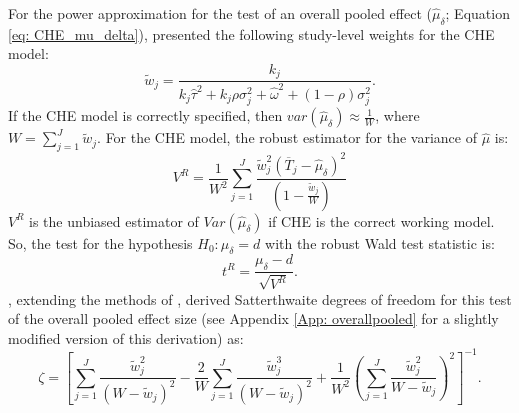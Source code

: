 For the power approximation for the test of an overall pooled effect ($\hat{\mu}_{\delta}$; Equation \ref{eq: CHE_mu_delta}), \textcite{vembye2023} presented the following study-level weights for the CHE model:
\begin{equation} \label{eq: CHEweights-study}
    \tilde{w}_j = \frac{k_j}{k_j\hat{\tau}^2 + k_j\rho\sigma_j^2 +\hat{\omega}^2 + (1- \rho)\sigma_j^2}.
\end{equation}
If the CHE model is correctly specified, then $var(\hat{\mu}_{\delta}) \approx \frac{1}{W}$, where $W = \sum_{j=1}^J \tilde{w}_j$. For the CHE model, the robust estimator for the variance of $\hat{\mu}$ is:
\begin{equation}
    V^R = \frac{1}{W^2}\sum_{j=1}^J\frac{\tilde{w}_j^2(\overline{T}_j -\hat{\mu}_{\delta})^2}{(1-\frac{\tilde{w}_j}{W})}
\end{equation}
$V^R$ is the unbiased estimator of $Var(\hat{\mu}_{\delta})$ if CHE is the correct working model. So, the test for the hypothesis $H_0: \mu_{\delta} = d$ with the robust Wald test statistic is:
\begin{equation}
    t^R = \frac{\mu_{\delta} - d}{\sqrt{V^R}}.
\end{equation}
\textcite{vembye2023}, extending the methods of \textcite{tipton2015a}, derived Satterthwaite degrees of freedom for this test of the overall pooled effect size (see Appendix \ref{App: overallpooled} for a slightly modified version of this derivation) as:
\begin{equation} \label{eq: satt df overall pooled}
    \zeta = \left[ \sum_{j=1}^J \frac{\tilde{w}_j^2}{(W-\tilde{w}_j)^2} - \frac{2}{W} \sum_{j=1}^J \frac{\tilde{w}_j^3}{(W-\tilde{w}_j)^2} + \frac{1}{W^2} \left(\sum_{j=1}^J \frac{\tilde{w}_j^2}{W-\tilde{w}_j}   \right)^2\right]^{-1}.
\end{equation}

